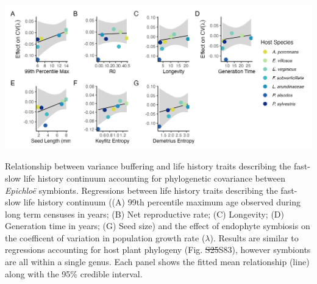 \documentclass[lineno, sn-basic]{sn-jnl}%
\providecommand{\DIFadd}[1]{{\protect\color{blue}#1}} %
\providecommand{\DIFdel}[1]{{\protect\color{red}\protect\scriptsize\sout{#1}}}
\providecommand{\DIFadd}[1]{{\protect\color{blue}\uwave{#1}}} %
\providecommand{\DIFdel}[1]{{\protect\color{red}\sout{#1}}}                      %
\providecommand{\DIFaddbegin}{} %
\providecommand{\DIFaddend}{} %
\providecommand{\DIFdelbegin}{} %
\providecommand{\DIFdelend}{} %
\providecommand{\DIFaddFL}[1]{\DIFadd{#1}} %
\providecommand{\DIFdelFL}[1]{\DIFdel{#1}} %
\providecommand{\DIFaddbeginFL}{} %
\providecommand{\DIFaddendFL}{} %
\providecommand{\DIFdelbeginFL}{} %
\providecommand{\DIFdelendFL}{} %
\newcommand{\DIFscaledelfig}{0.5}
\newlength{\DIFdelgraphicswidth} %
\newlength{\DIFdelgraphicsheight} %
\newcommand{\DIFaddincludegraphics}[2][]{{\color{blue}\fbox{\DIFOincludegraphics[#1]{#2}}}} %
\newcommand{\DIFdelincludegraphics}[2][]{%
\sbox{\DIFdelgraphicsbox}{\DIFOincludegraphics[#1]{#2}}%
\settoboxwidth{\DIFdelgraphicswidth}{\DIFdelgraphicsbox} %
\settoboxtotalheight{\DIFdelgraphicsheight}{\DIFdelgraphicsbox} %
\scalebox{\DIFscaledelfig}{%
\parbox[b]{\DIFdelgraphicswidth}{\usebox{\DIFdelgraphicsbox}\\[-\baselineskip] \rule{\DIFdelgraphicswidth}{0em}}\llap{\resizebox{\DIFdelgraphicswidth}{\DIFdelgraphicsheight}{%
\setlength{\unitlength}{\DIFdelgraphicswidth}%
\begin{picture}(1,1)%
\thicklines\linethickness{2pt} %
{\color[rgb]{1,0,0}\put(0,0){\framebox(1,1){}}}%
{\color[rgb]{1,0,0}\put(0,0){\line( 1,1){1}}}%
{\color[rgb]{1,0,0}\put(0,1){\line(1,-1){1}}}%
\end{picture}%
}\hspace*{3pt}}} %
} %
\DeclareRobustCommand{\DIFaddbegin}{\DIFOaddbegin \let\includegraphics\DIFaddincludegraphics} %
\DeclareRobustCommand{\DIFaddend}{\DIFOaddend \let\includegraphics\DIFOincludegraphics} %
\DeclareRobustCommand{\DIFdelbegin}{\DIFOdelbegin \let\includegraphics\DIFdelincludegraphics} %
\DeclareRobustCommand{\DIFdelend}{\DIFOaddend \let\includegraphics\DIFOincludegraphics} %
\DeclareRobustCommand{\DIFaddbeginFL}{\DIFOaddbeginFL \let\includegraphics\DIFaddincludegraphics} %
\DeclareRobustCommand{\DIFaddendFL}{\DIFOaddendFL \let\includegraphics\DIFOincludegraphics} %
\DeclareRobustCommand{\DIFdelbeginFL}{\DIFOdelbeginFL \let\includegraphics\DIFdelincludegraphics} %
\DeclareRobustCommand{\DIFdelendFL}{\DIFOaddendFL \let\includegraphics\DIFOincludegraphics} %
\begin{document}
\DIFdelbegin %
\DIFdelendFL \DIFaddbeginFL \begin{myfigure}[H]
	\DIFaddendFL \centering
	\includegraphics[width=\linewidth]{lh_epichloe_plot.png}
	\label{fig:lh_epich}
	\DIFdelbeginFL %
\DIFdelendFL \DIFaddbeginFL \caption[Relationship between variance buffering and life history traits describing the fast-slow life history continuum accounting for phylogenetic covariance between \emph{Epichlo\"{e}} symbionts]{\DIFaddendFL Relationship between variance buffering and life history traits describing the fast-slow life history continuum accounting for phylogenetic covariance between \emph{Epichlo\"{e}} symbionts. Regressions between life history traits describing the fast-slow life history continuum ((A) 99th percentile maximum age observed during long term censuses in years; (B) Net reproductive rate; (C) Longevity; (D) Generation time in years; (G) Seed size) and the effect of endophyte symbiosis on the coefficent of variation in population growth rate ($\lambda$). Results are similar to regressions accounting for host plant phylogeny (Fig. \DIFdelbeginFL \DIFdelFL{S25}\DIFdelendFL \DIFaddbeginFL \DIFaddFL{S83}\DIFaddendFL ), however symbionts are all within a single genus. Each panel shows the fitted mean relationship (line) along with the 95\% credible interval.}
\DIFdelbeginFL %
\DIFdelend \DIFaddbegin \end{myfigure}
\DIFaddend 
\end{document}
